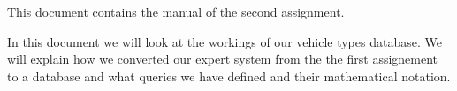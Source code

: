 This document contains the manual of the second assignment.

In this document we will look at the workings of our vehicle types database.
We will explain how we converted our expert system from the the first
assignement to a database and what queries we have defined and their
mathematical notation.
